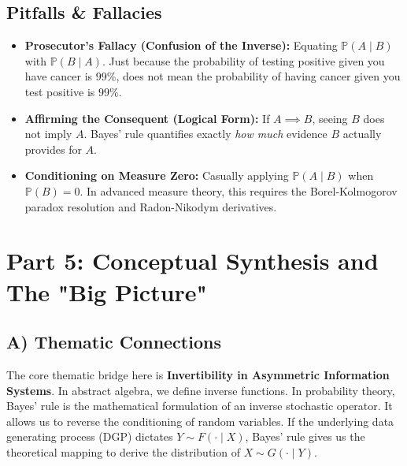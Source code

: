\documentclass[12pt]{article}
\theoremstyle{definition}
\theoremstyle{remark}
\newcommand{\Pbb}{\mathbb{P}}
\begin{document}
\subsection{Pitfalls \& Fallacies}
\begin{itemize}
    \item \textbf{Prosecutor's Fallacy (Confusion of the Inverse):} Equating $\Pbb(A \mid B)$ with $\Pbb(B \mid A)$. Just because the probability of testing positive given you have cancer is $99\%$, does not mean the probability of having cancer given you test positive is $99\%$.
    \item \textbf{Affirming the Consequent (Logical Form):} If $A \implies B$, seeing $B$ does not imply $A$. Bayes' rule quantifies exactly \textit{how much} evidence $B$ actually provides for $A$.
    \item \textbf{Conditioning on Measure Zero:} Casually applying $\Pbb(A \mid B)$ when $\Pbb(B)=0$. In advanced measure theory, this requires the Borel-Kolmogorov paradox resolution and Radon-Nikodym derivatives.
\end{itemize}

\newpage
\section{Part 5: Conceptual Synthesis and The "Big Picture"}

\subsection{A) Thematic Connections}
The core thematic bridge here is \textbf{Invertibility in Asymmetric Information Systems}. In abstract algebra, we define inverse functions. In probability theory, Bayes' rule is the mathematical formulation of an inverse stochastic operator. It allows us to reverse the conditioning of random variables. If the underlying data generating process (DGP) dictates $Y \sim F(\cdot \mid X)$, Bayes' rule gives us the theoretical mapping to derive the distribution of $X \sim G(\cdot \mid Y)$.
\end{document}
